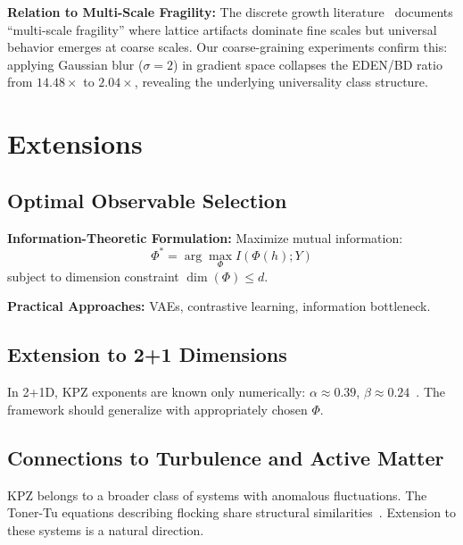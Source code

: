 \documentclass[aps,pre,reprint,amsmath,amssymb,superscriptaddress]{revtex4-2}
\begin{document}
\textbf{Relation to Multi-Scale Fragility:} The discrete growth literature~\cite{HAL2016,FloryanGraham2020} documents ``multi-scale fragility'' where lattice artifacts dominate fine scales but universal behavior emerges at coarse scales. Our coarse-graining experiments confirm this: applying Gaussian blur ($\sigma = 2$) in gradient space collapses the EDEN/BD ratio from $14.48\times$ to $2.04\times$, revealing the underlying universality class structure.

\section{Extensions}
\label{sec:extensions}

\subsection{Optimal Observable Selection}

\textbf{Information-Theoretic Formulation:} Maximize mutual information:
\begin{equation}
\Phi^* = \arg\max_\Phi I(\Phi(h); Y)
\end{equation}
subject to dimension constraint $\dim(\Phi) \leq d$.

\textbf{Practical Approaches:} VAEs, contrastive learning, information bottleneck.

\subsection{Extension to 2+1 Dimensions}

In 2+1D, KPZ exponents are known only numerically: $\alpha \approx 0.39$, $\beta \approx 0.24$~\cite{HalpinHealy2013}. The framework should generalize with appropriately chosen $\Phi$.

\subsection{Connections to Turbulence and Active Matter}

KPZ belongs to a broader class of systems with anomalous fluctuations. The Toner-Tu equations describing flocking share structural similarities~\cite{TonerTu1998}. Extension to these systems is a natural direction.

\end{document}
